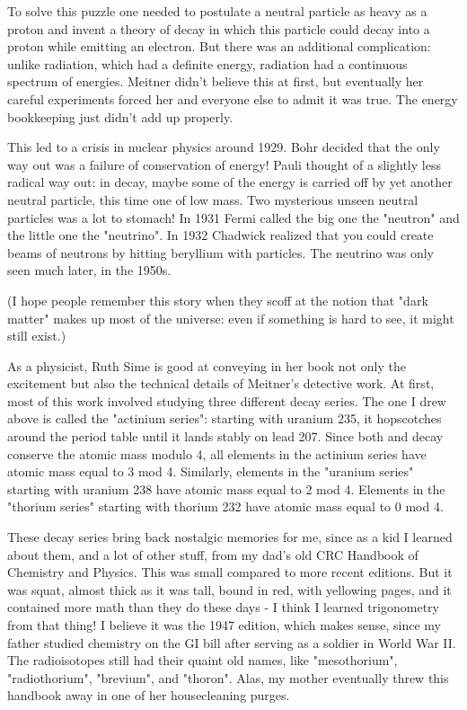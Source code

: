 To solve this puzzle one needed to postulate a neutral particle as heavy
as a proton and invent a theory of \beta  decay in which this particle could
decay into a proton while emitting an electron.  But there was an
additional complication: unlike \alpha  radiation, which had a definite
energy, \beta  radiation had a continuous spectrum of energies.  Meitner
didn't believe this at first, but eventually her careful experiments
forced her and everyone else to admit it was true.  The energy
bookkeeping just didn't add up properly.

This led to a crisis in nuclear physics around 1929.  Bohr decided that
the only way out was a failure of conservation of energy!  Pauli thought
of a slightly less radical way out: in \beta  decay, maybe some of the
energy is carried off by yet another neutral particle, this time one of
low mass.  Two mysterious unseen neutral particles was a lot to stomach!
In 1931 Fermi called the big one the "neutron" and the little
one the "neutrino".  In 1932 Chadwick realized that you could
create beams of neutrons by hitting beryllium with \alpha  particles.  The
neutrino was only seen much later, in the 1950s.

(I hope people remember this story when they scoff at the notion that
"dark matter" makes up most of the universe: even if something
is hard to see, it might still exist.)


As a physicist, Ruth Sime is good at conveying in her book not only 
the excitement but also the technical details of Meitner's detective
work.  At first, most of this work involved studying three different
decay series.  The one I drew above is called the "actinium
series": starting with uranium 235, it hopscotches around the
period table until it lands stably on lead 207.  Since both \alpha  and
\beta  decay conserve the atomic mass modulo 4, all elements in the
actinium series have atomic mass equal to 3 mod 4.  Similarly,
elements in the "uranium series" starting with uranium 238
have atomic mass equal to 2 mod 4.  Elements in the "thorium
series" starting with thorium 232 have atomic mass equal to 0
mod 4.


These decay series bring back nostalgic memories for me, since as a kid
I learned about them, and a lot of other stuff, from my dad's old CRC
Handbook of Chemistry and Physics.  This was small compared to more
recent editions.  But it was squat, almost thick as it was tall, bound
in red, with yellowing pages, and it contained more math than they do
these days - I think I learned trigonometry from that thing!  I believe
it was the 1947 edition, which makes sense, since my father studied
chemistry on the GI bill after serving as a soldier in World War II.
The radioisotopes still had their quaint old names, like
"mesothorium", "radiothorium", "brevium",
and "thoron".  Alas, my mother eventually threw this handbook
away in one of her housecleaning purges.

